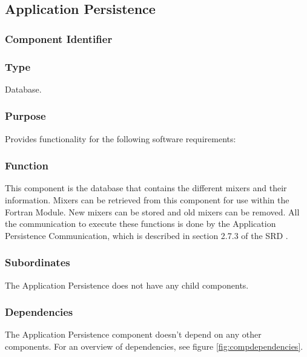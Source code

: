 \subsection{Application Persistence}
\label{subsec:apppersistence}

\subsubsection*{Component Identifier}
\RTMSAP{}

\subsubsection*{Type}
Database.

\subsubsection*{Purpose}
Provides functionality for the following software requirements:

\noindent {}

\subsubsection*{Function}
This component is the database that contains the different mixers and their information. Mixers can be retrieved from this component for use within the Fortran Module. New mixers can be stored and old mixers can be removed. All the communication to execute these functions is done by the Application Persistence Communication, which is described in section 2.7.3 of the SRD \cite{srd}.

\subsubsection*{Subordinates}
The Application Persistence does not have any child components.

\subsubsection*{Dependencies}
The Application Persistence component doesn't depend on any other components. For an overview of dependencies, see figure \ref{fig:compdependencies}.

